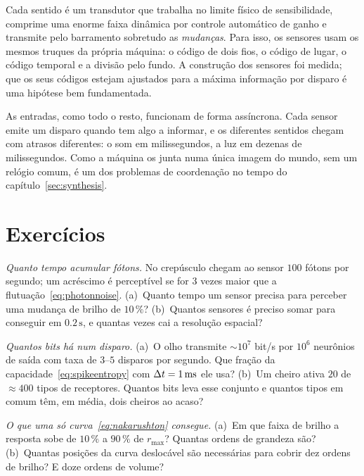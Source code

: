 \begin{keyblock}
\begin{proposition}
\label{prop:sensors}
Cada sentido é um transdutor que trabalha no limite físico de sensibilidade, comprime uma enorme faixa dinâmica por controle automático de ganho e transmite pelo barramento  sobretudo as \emph{mudanças}. Para isso, os sensores usam os mesmos truques da própria máquina: o código de dois fios, o código de lugar, o código temporal e a divisão pelo fundo. A construção dos sensores foi medida; que os seus códigos estejam ajustados para a máxima informação por disparo é uma hipótese bem fundamentada.
\end{proposition}
\end{keyblock}

As entradas, como todo o resto, funcionam de forma assíncrona. Cada sensor emite um disparo quando tem algo a informar, e os diferentes sentidos chegam com atrasos diferentes: o som em milissegundos, a luz em dezenas de milissegundos. Como a máquina os junta numa única imagem do mundo, sem um relógio comum, é um dos problemas de coordenação no tempo do capítulo~\ref{sec:synthesis}.

\section{Exercícios}

\begin{exercise}[\lvlA]
\label{ex:11:1}
\emph{Quanto tempo acumular fótons.} No crepúsculo chegam ao sensor $100$ fótons por segundo; um acréscimo é perceptível se for $3$ vezes maior que a flutuação~\eqref{eq:photonnoise}. (a)~Quanto tempo um sensor precisa para perceber uma mudança de brilho de $10\,\%$? (b)~Quantos sensores é preciso somar para conseguir em $0.2\,\text{s}$, e quantas vezes cai a resolução espacial?
\end{exercise}

\begin{exercise}[\lvlA]
\label{ex:11:2}
\emph{Quantos bits há num disparo.} (a)~O olho transmite $\sim10^7$ bit/s por $10^6$ neurônios de saída com taxa de $3$--$5$ disparos por segundo. Que fração da capacidade~\eqref{eq:spikeentropy} com $\Delta t=1\,\text{ms}$ ele usa? (b)~Um cheiro ativa $20$ de $\approx400$ tipos de receptores. Quantos bits leva esse conjunto e quantos tipos em comum têm, em média, dois cheiros ao acaso?
\end{exercise}

\begin{exercise}[\lvlB]
\label{ex:11:3}
\emph{O que uma só curva~\eqref{eq:nakarushton} consegue.} (a)~Em que faixa de brilho a resposta sobe de $10\,\%$ a $90\,\%$ de $r_{\max}$? Quantas ordens de grandeza são? (b)~Quantas posições da curva deslocável são necessárias para cobrir dez ordens de brilho? E doze ordens de volume?
\end{exercise}

